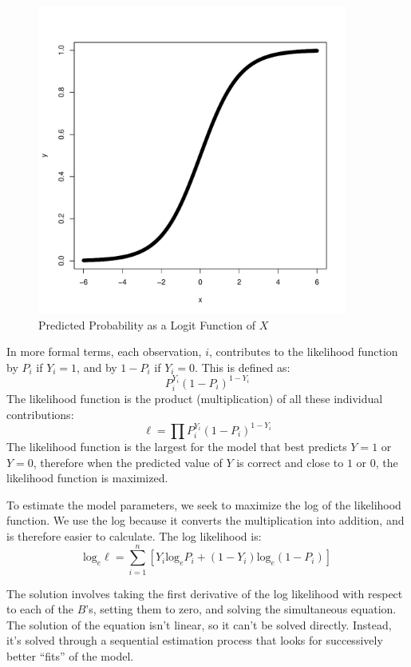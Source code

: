 \documentclass[11pt,openany]{book}\usepackage[]{graphicx}\usepackage[]{color}
\begin{document}
\begin{figure}
        \centering
        \includegraphics[width=4in]{16_Logit/logex.pdf}%
        \caption{Predicted Probability as a Logit Function of $X$ \label{fig:logex}}
\end{figure}   

In more formal terms, each observation, $i$,  contributes to the likelihood function by $P_i$ if $Y_i=1$, and by $1-P_i$ if $Y_i=0$. This is defined as: 
\begin{equation*}
  P^{Y_{i}}_i(1-P_i)^{1-Y_i}
\end{equation*}
\noindent The likelihood function is the product (multiplication) of all these individual contributions:
\begin{equation*}
  \ell = \prod P^{Y_{i}}_i(1-P_i)^{1-Y_i}
\end{equation*}
\noindent The likelihood function is the largest for the model that best predicts $Y=1$ or $Y=0$, therefore when the predicted value of $Y$ is correct and close to $1$ or $0$, the likelihood function is maximized. 

To estimate the model parameters, we seek to maximize the log of the likelihood function. We use the log because it converts the multiplication into addition, and is therefore easier to calculate. The log likelihood is:
\begin{equation*}
  \text{log}_e \ell = \sum^{n}_{i=1}[Y_i \text{log}_e P_i+(1-Y_i)\text{log}_e(1-P_i)]
\end{equation*}

The solution involves taking the first derivative of the log likelihood with respect to each of the $B$’s, setting them to zero, and solving the simultaneous equation.  The solution of the equation isn't linear, so it can't be solved directly.  Instead, it's solved through a sequential estimation process that looks for successively better ``fits'' of the model. 
\end{document}
